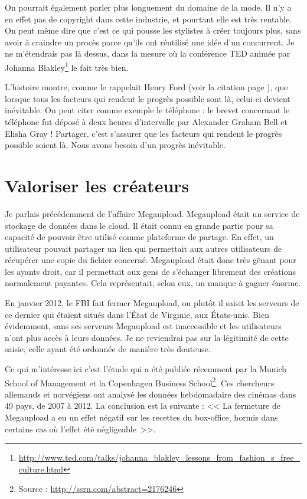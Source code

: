 On pourrait également parler plus longuement du domaine de la mode.
Il n'y a en effet pas de copyright dans cette industrie, et pourtant elle est très rentable.
On peut même dire que c'est ce qui pousse les stylistes à créer toujours plus, sans avoir à craindre un procès parce qu'ils ont réutilisé une idée d'un concurrent.
Je ne m'étendrais pas là dessus, dans la mesure où la conférence TED animée par Johanna Blakley\footnote{\url{http://www.ted.com/talks/johanna_blakley_lessons_from_fashion_s_free_culture.html}} le fait très bien.

L'histoire montre, comme le rappelait Henry Ford (voir la citation page \pageref{ford}), que lorsque tous les facteurs qui rendent le progrès possible sont là, celui-ci devient inévitable.
On peut citer comme exemple le téléphone : le brevet concernant le téléphone fut déposé à deux heures d'intervalle par Alexander Graham Bell et Elisha Gray !
Partager, c'est s'assurer que les facteurs qui rendent le progrès possible soient là.
Nous avons besoin d'un progrès inévitable.

\section{Valoriser les créateurs}

Je parlais précédemment de l'affaire Megaupload.
Megaupload était un service de stockage de données dans le cloud.
Il était connu en grande partie pour sa capacité de pouvoir être utilisé comme plateforme de partage.
En effet, un utilisateur pouvait partager un lien qui permettait aux autres utilisateurs de récupérer une copie du fichier concerné.
Megaupload était donc très gênant pour les ayants droit, car il permettait aux gens de s'échanger librement des créations normalement payantes.
Cela représentait, selon eux, un manque à gagner énorme.

En janvier 2012, le FBI fait fermer Megaupload, ou plutôt il saisit les serveurs de ce dernier qui étaient situés dans l'État de Virginie, aux États-unis.
Bien évidemment, sans ses serveurs Megaupload est inaccessible et les utilisateurs n'ont plus accès à leurs données.
Je ne reviendrai pas sur la légitimité de cette saisie, celle ayant été ordonnée de manière très douteuse.

Ce qui m'intéresse ici c'est l'étude qui a été publiée récemment par la Munich School of Management et la Copenhagen Business School\footnote{Source : \url{http://ssrn.com/abstract=2176246}}.
Ces chercheurs allemands et norvégiens ont analysé les données hebdomadaire des cinémas dans 49 pays, de 2007 à 2012.
La conclusion est la suivante : << La fermeture de Megaupload a eu un effet négatif sur les recettes du box-office, hormis dans certains cas où l'effet été négligeable~>>.


